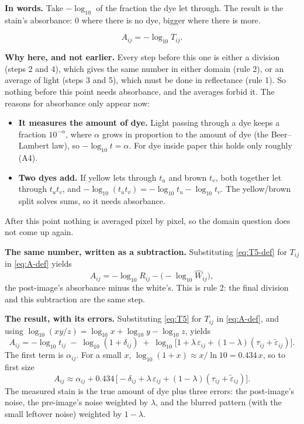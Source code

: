 \documentclass[11pt,letter]{article}
\newcommand{\Lten}{\log_{10}}
\begin{document}
\textbf{In words.}  Take $-\Lten$ of the fraction the dye let through.
The result is the stain's absorbance: 0 where there is no dye, bigger
where there is more.

\begin{equation}
  A_{ij} = -\Lten T_{ij} .
  \label{eq:A-def}
\end{equation}

\textbf{Why here, and not earlier.}  Every step before this one is either
a division (steps 2 and 4), which gives the same number in either domain
(rule 2), or an average of light (steps 3 and 5), which must be done in
reflectance (rule 1).  So nothing before this point needs absorbance, and
the averages forbid it.  The reasons for absorbance only appear now:
\begin{itemize}[nosep]
  \item \textbf{It measures the amount of dye.}  Light passing through a
    dye keeps a fraction $10^{-\alpha}$, where $\alpha$ grows in
    proportion to the amount of dye (the Beer--Lambert law), so
    $-\Lten t = \alpha$.  For dye inside paper this holds only roughly
    (A4).
  \item \textbf{Two dyes add.}  If yellow lets through $t_u$ and brown
    $t_v$, both together let through $t_u t_v$, and
    $-\Lten (t_u t_v) = -\Lten t_u - \Lten t_v$.  The yellow/brown split
    solves sums, so it needs absorbance.
\end{itemize}
After this point nothing is averaged pixel by pixel, so the domain question
does not come up again.

\textbf{The same number, written as a subtraction.}  Substituting
\eqref{eq:T5-def} for $T_{ij}$ in \eqref{eq:A-def} yields
\begin{equation}
  A_{ij} = -\Lten R_{ij} - \bigl(-\Lten \widehat W_{ij}\bigr) ,
  \label{eq:A-sub}
\end{equation}
the post-image's absorbance minus the white's.  This is rule 2: the final
division and this subtraction are the same step.

\textbf{The result, with its errors.}  Substituting \eqref{eq:T5} for
$T_{ij}$ in \eqref{eq:A-def}, and using $\Lten(xy/z) = \Lten x + \Lten y -
\Lten z$, yields
\begin{equation}
  A_{ij} = -\Lten t_{ij} \;-\; \Lten(1 + \delta_{ij}) \;+\;
    \Lten\bigl[1 + \lambda\,\varepsilon_{ij}
    + (1 - \lambda)(\tau_{ij} + \widetilde\varepsilon_{ij})\bigr] .
  \label{eq:A-exact}
\end{equation}
The first term is $\alpha_{ij}$.  For a small $x$,
$\Lten(1 + x) \approx x / \ln 10 = 0.434\, x$, so to first size
\begin{equation}
  A_{ij} \approx \alpha_{ij} + 0.434\,\bigl[-\delta_{ij}
    + \lambda\,\varepsilon_{ij}
    + (1 - \lambda)(\tau_{ij} + \widetilde\varepsilon_{ij})\bigr] .
  \label{eq:A-first}
\end{equation}
The measured stain is the true amount of dye plus three errors: the
post-image's noise, the pre-image's noise weighted by $\lambda$, and the
blurred pattern (with the small leftover noise) weighted by $1 - \lambda$.
\end{document}
